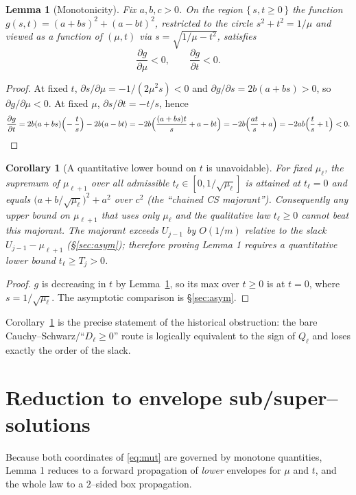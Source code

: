 \documentclass[11pt]{article}
\newtheorem{lemma}{Lemma}
\newtheorem{corollary}{Corollary}
\theoremstyle{definition}
\begin{document}
\begin{lemma}[Monotonicity]\label{lem:mono}
Fix $a,b,c>0$. On the region $\{\,s,t\ge 0\,\}$ the function
$g(s,t)=(a+bs)^2+(a-bt)^2$, restricted to the circle $s^2+t^2=1/\mu$ and viewed
as a function of $(\mu,t)$ via $s=\sqrt{1/\mu-t^2}$, satisfies
\[
\frac{\partial g}{\partial \mu}<0,\qquad \frac{\partial g}{\partial t}<0 .
\]
\end{lemma}

\begin{proof}
At fixed $t$, $\partial s/\partial\mu=-1/(2\mu^2 s)<0$ and
$\partial g/\partial s=2b(a+bs)>0$, so $\partial g/\partial\mu<0$.
At fixed $\mu$, $\partial s/\partial t=-t/s$, hence
\[
\frac{\partial g}{\partial t}=2b(a+bs)\Big(\!-\frac{t}{s}\Big)-2b(a-bt)
=-2b\Big(\frac{(a+bs)t}{s}+a-bt\Big)
=-2b\Big(\frac{at}{s}+a\Big)=-2ab\Big(\frac{t}{s}+1\Big)<0. \qedhere
\]
\end{proof}

\begin{corollary}[A quantitative lower bound on $t$ is unavoidable]
\label{cor:needt}
For fixed $\mu_\ell$, the supremum of $\mu_{\ell+1}$ over all admissible
$t_\ell\in[0,1/\sqrt{\mu_\ell}]$ is attained at $t_\ell=0$ and equals
$\big(a+b/\sqrt{\mu_\ell}\big)^2+a^2$ over $c^2$ (the ``chained CS majorant'').
Consequently any upper bound on $\mu_{\ell+1}$ that uses only $\mu_\ell$ and the
qualitative law $t_\ell\ge 0$ cannot beat this majorant. The majorant exceeds
$U_{j-1}$ by $O(1/m)$ \emph{relative to the slack} $U_{j-1}-\mu_{\ell+1}$
(\S\ref{sec:asym}); therefore proving Lemma 1 \emph{requires} a quantitative
lower bound $t_\ell\ge T_j>0$.
\end{corollary}

\begin{proof}
$g$ is decreasing in $t$ by Lemma~\ref{lem:mono}, so its max over $t\ge0$ is at
$t=0$, where $s=1/\sqrt{\mu_\ell}$. The asymptotic comparison is \S\ref{sec:asym}.
\end{proof}

Corollary~\ref{cor:needt} is the precise statement of the historical
obstruction: the bare Cauchy--Schwarz/``$D_\ell\ge0$'' route is logically
equivalent to the sign of $Q_\ell$ and loses exactly the order of the slack.

\section{Reduction to envelope sub/super--solutions}

Because both coordinates of \eqref{eq:mut} are governed by monotone quantities,
Lemma 1 reduces to a forward propagation of \emph{lower} envelopes for $\mu$ and
$t$, and the whole law to a $2$--sided box propagation.
\end{document}
